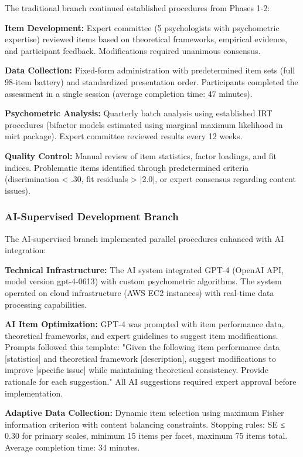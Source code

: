 \documentclass[12pt,a4paper]{article}
\begin{document}
The traditional branch continued established procedures from Phases 1-2:

\textbf{Item Development:} Expert committee (5 psychologists with psychometric expertise) reviewed items based on theoretical frameworks, empirical evidence, and participant feedback. Modifications required unanimous consensus.

\textbf{Data Collection:} Fixed-form administration with predetermined item sets (full 98-item battery) and standardized presentation order. Participants completed the assessment in a single session (average completion time: 47 minutes).

\textbf{Psychometric Analysis:} Quarterly batch analysis using established IRT procedures (bifactor models estimated using marginal maximum likelihood in mirt package). Expert committee reviewed results every 12 weeks.

\textbf{Quality Control:} Manual review of item statistics, factor loadings, and fit indices. Problematic items identified through predetermined criteria (discrimination < .30, fit residuals > |2.0|, or expert consensus regarding content issues).

\subsubsection{AI-Supervised Development Branch}

The AI-supervised branch implemented parallel procedures enhanced with AI integration:

\textbf{Technical Infrastructure:} The AI system integrated GPT-4 (OpenAI API, model version gpt-4-0613) with custom psychometric algorithms. The system operated on cloud infrastructure (AWS EC2 instances) with real-time data processing capabilities.

\textbf{AI Item Optimization:} GPT-4 was prompted with item performance data, theoretical frameworks, and expert guidelines to suggest item modifications. Prompts followed this template: "Given the following item performance data [statistics] and theoretical framework [description], suggest modifications to improve [specific issue] while maintaining theoretical consistency. Provide rationale for each suggestion." All AI suggestions required expert approval before implementation.

\textbf{Adaptive Data Collection:} Dynamic item selection using maximum Fisher information criterion with content balancing constraints. Stopping rules: SE ≤ 0.30 for primary scales, minimum 15 items per facet, maximum 75 items total. Average completion time: 34 minutes.
\end{document}
